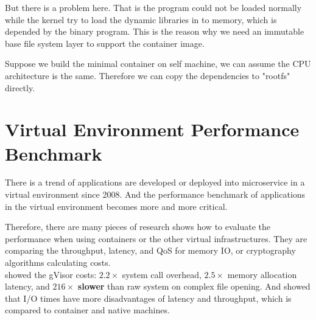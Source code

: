 But there is a problem here. That is the program could not be loaded normally while
the kernel try to load the dynamic libraries in to memory, which is depended by the
binary program. This is the reason why we need an immutable base file system layer to
support the container image.

Suppose we build the minimal container on self machine, we can assume the CPU architecture
is the same. Therefore we can copy the dependencies to "rootfs" directly.



\section{Virtual Environment Performance Benchmark}
There is a trend of applications are developed or deployed into microservice in a virtual
environment since 2008. And the performance benchmark of applications in the virtual
environment becomes more and more critical.

Therefore, there are many pieces of research shows how to evaluate the performance when
using containers or the other virtual infrastructures\cite{7371699,KOZHIRBAYEV2017175,7095802,234857}.
They are comparing the throughput, latency, and QoS for memory IO, or cryptography
algorithms calculating costs.\\

\textcite{234857} showed the gVisor costs: $2.2\times$ system call overhead,
$2.5\times$ memory allocation latency, and $216\times$ \textbf{slower} than raw system on
complex file opening. And \textcite{KOZHIRBAYEV2017175} showed that I/O times have more
disadvantages of latency and throughput, which is compared to container and native machines.

